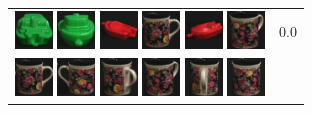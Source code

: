 \begin{figure}[tbp]
\begin{center}
\begin{tabular}{m{11cm} | m{3cm} |}
\includegraphics[width=1cm]{coil/beeld-59.eps} 
\includegraphics[width=1cm]{coil/beeld-56.eps} 
\includegraphics[width=1cm]{coil/beeld-22.eps} 
\includegraphics[width=1cm]{coil/beeld-60.eps} 
\includegraphics[width=1cm]{coil/beeld-21.eps} 
\includegraphics[width=1cm]{coil/beeld-63.eps} & {\scriptsize 0.0} \\ 
\includegraphics[width=1cm]{coil/beeld-60.eps} 
\includegraphics[width=1cm]{coil/beeld-61.eps} 
\includegraphics[width=1cm]{coil/beeld-64.eps} 
\includegraphics[width=1cm]{coil/beeld-63.eps} 
\includegraphics[width=1cm]{coil/beeld-65.eps} 
\includegraphics[width=1cm]{coil/beeld-62.eps} 

\end{tabular}
\end{center}
\end{figure}
